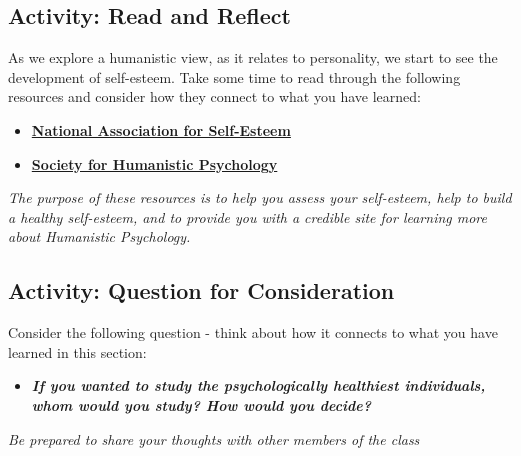 \documentclass[
]{book}
\providecommand{\tightlist}{%
  \setlength{\itemsep}{0pt}\setlength{\parskip}{0pt}}
\begin{document}
\hypertarget{activity-read-and-reflect-4}{%
\subsection*{Activity: Read and Reflect}\label{activity-read-and-reflect-4}}

\begin{reflect}
As we explore a humanistic view, as it relates to personality, we start to see the development of self-esteem. Take some time to read through the following resources and consider how they connect to what you have learned:

\begin{itemize}
\tightlist
\item
  \href{http://healthyselfesteem.org/}{\textbf{National Association for Self-Esteem}}\\
\item
  \href{https://www.apa.org/about/division/div32}{\textbf{Society for Humanistic Psychology}}
\end{itemize}

\emph{The purpose of these resources is to help you assess your self-esteem, help to build a healthy self-esteem, and to provide you with a credible site for learning more about Humanistic Psychology.}
\end{reflect}

\hypertarget{activity-question-for-consideration-2}{%
\subsection*{Activity: Question for Consideration}\label{activity-question-for-consideration-2}}

\begin{reflect}
Consider the following question - think about how it connects to what you have learned in this section:

\begin{itemize}
\tightlist
\item
  \textbf{\emph{If you wanted to study the psychologically healthiest individuals, whom would you study? How would you decide?}}
\end{itemize}

\emph{Be prepared to share your thoughts with other members of the class}
\end{reflect}
\end{document}
